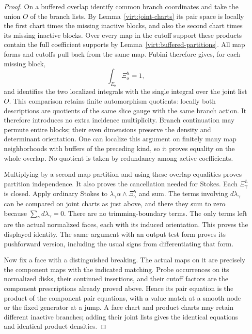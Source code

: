 \documentclass[11pt]{article}
\theoremstyle{definition}
\theoremstyle{remark}
\numberwithin{equation}{section}
\begin{document}
\begin{proof}
On a buffered overlap identify common branch coordinates and take the
union $O$ of the branch lists.  By Lemma~\ref{virt:joint-charts} its pair
space is locally the first chart times the missing inactive blocks, and
also the second chart times its missing inactive blocks.  Over every
map in the cutoff support these products contain the full coefficient
supports by Lemma~\ref{virt:buffered-partitions}.  All map forms and
cutoffs pull back from the same map.  Fubini therefore gives, for each
missing block,
\[
 \int_{E_o}\Xi_o^\hbar=1,
\]
and identifies the two localized integrals with the single integral
over the joint list $O$.  This comparison retains finite automorphism
quotients: locally both descriptions are quotients of the same slice
gauge with the same branch action.  It therefore introduces no extra
incidence multiplicity.  Branch continuation may permute entire blocks;
their even dimensions preserve the density and determinant orientation.
One can localize this argument on finitely many map neighborhoods with
buffers of the preceding kind, so it proves equality on the whole
overlap.  No quotient is taken by redundancy among active coefficients.

Multiplying by a second map partition and using these overlap equalities
proves partition independence.  It also proves the cancellation needed
for Stokes.  Each $\Xi_\gamma^\hbar$ is closed.  Apply ordinary Stokes
to $\lambda_\gamma\alpha\wedge\Xi_\gamma^\hbar$ and sum.  The
terms involving $d\lambda_\gamma$ can be compared on joint charts as
just above, and there they sum to zero because
$\sum_\gamma d\lambda_\gamma=0$.  There are no trimming-boundary
terms.  The only terms left are the actual normalized faces, each with
its induced orientation.  This proves the displayed identity.  The
same argument with an output test form proves its pushforward version,
including the usual signs from differentiating that form.

Now fix a face with a distinguished breaking.  The actual maps on it
are precisely the component maps with the indicated matching.  Probe
occurrences on its normalized disks, their continued insertions, and
their cutoff factors are the component prescriptions already proved
above.  Hence its pair equation is the product of the component pair
equations, with a value match at a smooth node or the fixed generator
at a jump.  A face chart and product charts may retain different
inactive branches; adding their joint lists gives the identical
equations and identical product densities.


\end{proof}
\end{document}
